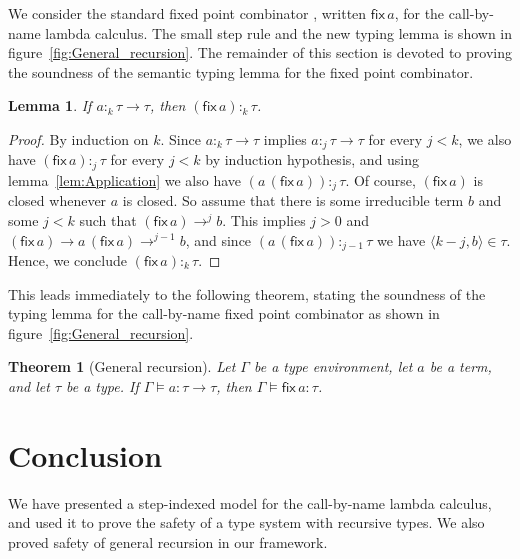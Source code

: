 \documentclass[10pt,a4paper,final,twocolumn]{article}
\theoremstyle{definition}
\theoremstyle{plain}
\newtheorem{lemma}[definition]{Lemma}
\newtheorem{theorem}[definition]{Theorem}
\newcommand{\app}[2]{\ensuremath{{#1}\,{#2}}}
\newcommand{\fix}[1]{\ensuremath{\mathsf{fix}\,{#1}}}
\newcommand{\pair}[1]{\ensuremath{\langle{#1}\rangle}}
\begin{document}
We consider the standard fixed point combinator \cite{Pierce02}, written $\fix{a}$, for the
call-by-name lambda calculus. The small step rule and the new typing lemma is shown in
figure~\ref{fig:General_recursion}. The remainder of this section is devoted to proving the
soundness of the semantic typing lemma for the fixed point combinator.

\begin{lemma}
  If $a :_k \tau \to \tau$, then $(\fix{a}) :_k \tau$.
\end{lemma}

\begin{proof}
  By induction on $k$. Since \mbox{$a :_k \tau \to \tau$} implies \mbox{$a :_j \tau \to \tau$} for every
  \mbox{$j < k$}, we also have \mbox{$(\fix{a}) :_j \tau$} for every \mbox{$j < k$} by induction hypothesis, and using
  lemma~\ref{lem:Application} we also have \mbox{$(\app{a}{(\fix{a})}) :_j \tau$}. Of course,
  \mbox{$(\fix{a})$} is closed whenever $a$ is closed. So assume that there is some irreducible term
  $b$ and some \mbox{$j < k$} such that \mbox{$(\fix{a}) \to^j b$}.
  This implies \mbox{$j > 0$} and \mbox{$(\fix{a}) \to \app{a}{(\fix{a})} \to^{j-1} b$}, and since
  \mbox{$(\app{a}{(\fix{a})}) :_{j-1} \tau$} we have \mbox{$\pair{k-j,b} \in \tau$}. Hence, we conclude
  \mbox{$(\fix{a}) :_k \tau$}.
\end{proof}

This leads immediately to the following theorem, stating the soundness of the typing lemma
for the call-by-name fixed point combinator as shown in figure~\ref{fig:General_recursion}.

\begin{theorem}[General recursion]
  Let $\Gamma$ be a type environment, let $a$ be a term, and let $\tau$ be a type.
  If \mbox{$\Gamma \models a : \tau \to \tau$}, then \mbox{$\Gamma \models \fix{a} : \tau$}.
\end{theorem}


\section{Conclusion}
\label{sec:Conclusion}


We have presented a step-indexed model for the call-by-name lambda calculus, and used it to
prove the safety of a type system with recursive types. We also proved safety of general
recursion in our framework.




\end{document}
